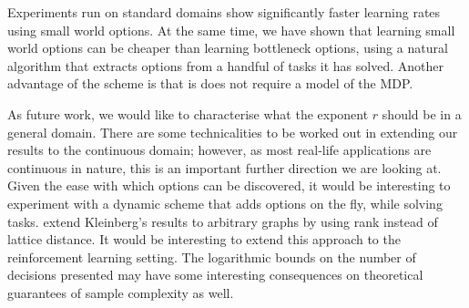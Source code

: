 Experiments run on standard domains show significantly faster learning
rates using small world options. At the same time, we have shown that
learning small world options can be cheaper than learning bottleneck
options, using a natural algorithm that extracts options from a handful
of tasks it has solved. Another advantage of the scheme is that is does
not require a model of the MDP. 

As future work, we would like to characterise what the exponent $r$
should be in a general domain. There are some technicalities to be
worked out in extending our results to the continuous domain; however,
as most real-life applications are continuous in nature, this is an
important further direction we are looking at.  Given the ease with
which options can be discovered, it would be interesting to experiment
with a dynamic scheme that adds options on the fly, while solving tasks.
\cite{Liben-Nowell2005} extend Kleinberg's results to arbitrary graphs
by using rank instead of lattice distance. It would be interesting to
extend this approach to the reinforcement learning setting. The
logarithmic bounds on the number of decisions presented may have some
interesting consequences on theoretical guarantees of sample complexity
as well.

